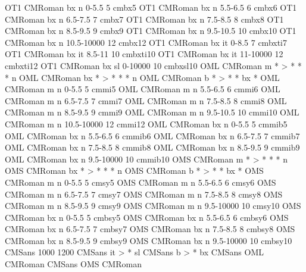 \declarefont OT1 CMRoman bx  n  0-5.5      5  cmbx5
\declarefont OT1 CMRoman bx  n  5.5-6.5    6  cmbx6
\declarefont OT1 CMRoman bx  n  6.5-7.5    7  cmbx7
\declarefont OT1 CMRoman bx  n  7.5-8.5    8  cmbx8
\declarefont OT1 CMRoman bx  n  8.5-9.5    9  cmbx9
\declarefont OT1 CMRoman bx  n  9.5-10.5   10 cmbx10
\declarefont OT1 CMRoman bx  n  10.5-10000 12 cmbx12
\declarefont OT1 CMRoman bx  it 0-8.5      7  cmbxti7  %
\declarefont OT1 CMRoman bx  it 8.5-11     10 cmbxti10
\declarefont OT1 CMRoman bx  it 11-10000   12 cmbxti12 %
\declarefont OT1 CMRoman bx  sl 0-10000    10 cmbxsl10
%
\fontmap OML CMRoman m * > * * * n
\fontmap OML CMRoman bx * > * * * n
\fontmap OML CMRoman b * > * * bx *
\declarefont OML CMRoman m   n  0-5.5      5  cmmi5
\declarefont OML CMRoman m   n  5.5-6.5    6  cmmi6
\declarefont OML CMRoman m   n  6.5-7.5    7  cmmi7
\declarefont OML CMRoman m   n  7.5-8.5    8  cmmi8
\declarefont OML CMRoman m   n  8.5-9.5    9  cmmi9
\declarefont OML CMRoman m   n  9.5-10.5   10 cmmi10
\declarefont OML CMRoman m   n  10.5-10000 12 cmmi12
\declarefont OML CMRoman bx  n  0-5.5      5  cmmib5
\declarefont OML CMRoman bx  n  5.5-6.5    6  cmmib6
\declarefont OML CMRoman bx  n  6.5-7.5    7  cmmib7
\declarefont OML CMRoman bx  n  7.5-8.5    8  cmmib8
\declarefont OML CMRoman bx  n  8.5-9.5    9  cmmib9
\declarefont OML CMRoman bx  n  9.5-10000  10 cmmib10
%
\fontmap OMS CMRoman m * > * * * n
\fontmap OMS CMRoman bx * > * * * n
\fontmap OMS CMRoman b * > * * bx *
\declarefont OMS CMRoman m   n  0-5.5      5  cmsy5
\declarefont OMS CMRoman m   n  5.5-6.5    6  cmsy6
\declarefont OMS CMRoman m   n  6.5-7.5    7  cmsy7
\declarefont OMS CMRoman m   n  7.5-8.5    8  cmsy8
\declarefont OMS CMRoman m   n  8.5-9.5    9  cmsy9
\declarefont OMS CMRoman m   n  9.5-10000  10 cmsy10
\declarefont OMS CMRoman bx  n  0-5.5      5  cmbsy5
\declarefont OMS CMRoman bx  n  5.5-6.5    6  cmbsy6
\declarefont OMS CMRoman bx  n  6.5-7.5    7  cmbsy7
\declarefont OMS CMRoman bx  n  7.5-8.5    8  cmbsy8
\declarefont OMS CMRoman bx  n  8.5-9.5    9  cmbsy9
\declarefont OMS CMRoman bx  n  9.5-10000  10 cmbsy10
%
%
\declarefontfamily CMSans 1000 1200
\fontmapshape CMSans it > * sl
\fontmapseries CMSans b > * bx
\fontmapfamily CMSans OML CMRoman
\fontmapfamily CMSans OMS CMRoman
